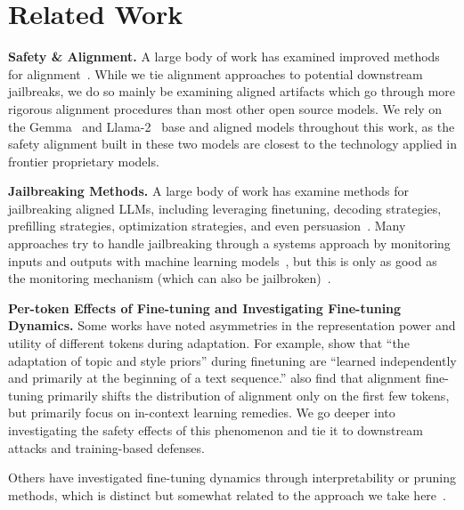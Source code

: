 
\section{Related Work}
\label{appendix:related}

\textbf{Safety \& Alignment.} A large body of work has examined improved methods for alignment~\citep{rafailov2023direct,ethayarajh2024kto,zou2023representation,bai2022constitutional,ouyang2022training,touvron2023llama-2,team2024gemma}. While we tie alignment approaches to potential downstream jailbreaks, we do so mainly be examining aligned artifacts which go through more rigorous alignment procedures than most other open source models. We rely on the Gemma~\citep{team2024gemma} and Llama-2~\citep{touvron2023llama-2} base and aligned models throughout this work, as the safety alignment built in these two models are closest to the technology applied in frontier proprietary models.

\textbf{Jailbreaking Methods.} A large body of work has examine methods for jailbreaking aligned LLMs, including leveraging finetuning, decoding strategies, prefilling strategies, optimization strategies, and even persuasion~\citep{andriushchenko2024jailbreaking,zou2023universal,qi2023fine,huang2023catastrophic,zeng2024johnny,zhan2023removing,yang2023shadow,gade2023badllama,prefilling-attack,qi2023visual}. Many approaches try to handle jailbreaking through a systems approach by monitoring inputs and outputs with machine learning models~\citep{inan2023llama}, but this is only as good as the monitoring mechanism (which can also be jailbroken)~\citep{break-llama-guard}.

\textbf{Per-token Effects of Fine-tuning and Investigating Fine-tuning Dynamics.} Some works have noted asymmetries in the representation power and utility of different tokens during adaptation. For example, \citet{zhang2024dissecting} show that ``the adaptation of topic and style priors'' during finetuning are ``learned independently and primarily at the beginning of a text sequence.'' \citet{lin2024unlocking} also find that alignment fine-tuning primarily shifts the distribution of alignment only on the first few tokens, but primarily focus on in-context learning remedies. We go deeper into investigating the safety effects of this phenomenon and tie it to downstream attacks and training-based defenses. 

Others have investigated fine-tuning dynamics through interpretability or pruning methods, which is distinct but somewhat related to the approach we take here~\citep{wei2024assessing,jain2023mechanistically}.

